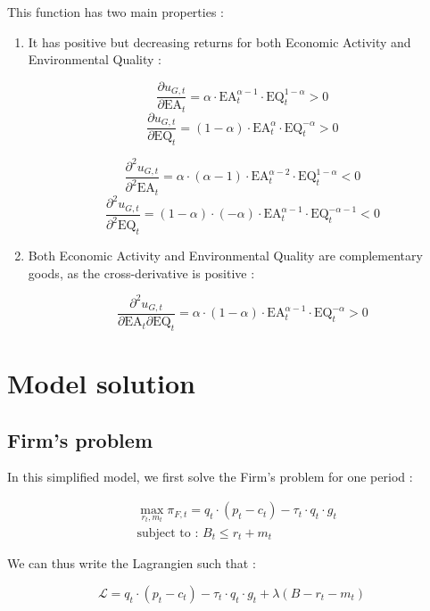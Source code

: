 \documentclass{article}
\begin{document}
This function has two main properties : 

\begin{enumerate}
    \item It has positive but decreasing returns for both Economic Activity and Environmental Quality : 

$$\frac{\partial u_{G,t}}{\partial \text{EA}_{t}}=\alpha\cdot\text{EA}_{t}^{\alpha-1}\cdot\text{EQ}_{t}^{1-\alpha}>0$$
$$\frac{\partial u_{G,t}}{\partial \text{EQ}_{t}}=(1-\alpha)\cdot\text{EA}_{t}^{\alpha}\cdot\text{EQ}_{t}^{-\alpha}>0$$

$$\frac{\partial^2 u_{G,t}}{\partial^2 \text{EA}_{t}}=\alpha\cdot(\alpha-1)\cdot\text{EA}_{t}^{\alpha-2}\cdot\text{EQ}_{t}^{1-\alpha}<0$$
$$\frac{\partial^2 u_{G,t}}{\partial^2 \text{EQ}_{t}}=(1-\alpha)\cdot(-\alpha)\cdot\text{EA}_{t}^{\alpha-1}\cdot\text{EQ}_{t}^{-\alpha-1}<0$$

    \item Both Economic Activity and Environmental Quality are complementary goods, as the cross-derivative is positive :
    
$$\frac{\partial^2 u_{G,t}}{\partial \text{EA}_{t} \partial \text{EQ}_{t}}=\alpha\cdot(1-\alpha)\cdot\text{EA}_{t}^{\alpha-1}\cdot\text{EQ}_{t}^{-\alpha}>0$$
\end{enumerate}

\section{Model solution}

\subsection{Firm's problem}

In this simplified model, we first solve the Firm's problem for one period : 

\begin{equation*}
    \begin{split}
    & \max_{r_{t},m_{t}}{\pi_{F,t}=q_{t}\cdot\left(p_{t}-c_{t}\right)-\tau_{t}\cdot q_{t}\cdot g_{t}} \\ 
    & \text{subject to : } B_{t} \leq r_{t} + m_{t}
    \end{split}
\end{equation*}

We can thus write the Lagrangien such that : 

\begin{equation*}
    \mathcal{L} = q_{t}\cdot\left(p_{t}-c_{t}\right)-\tau_{t}\cdot q_{t}\cdot g_{t}+\lambda\left(B-r_{t}-m_{t}\right)
\end{equation*}
\end{document}
